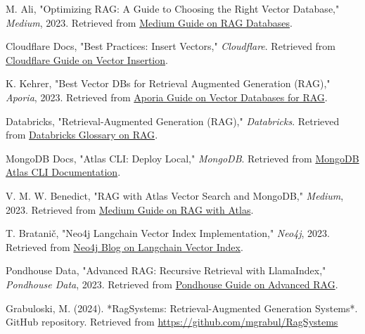 \documentclass{wseas}
\begin{document}
\begin{thebibliography}{9}
   M. Ali, "Optimizing RAG: A Guide to Choosing the Right Vector Database," \textit{Medium}, 2023. Retrieved from \href{https://medium.com/@mutahar789/optimizing-rag-a-guide-to-choosing-the-right-vector-database-480f71a33139}{Medium Guide on RAG Databases}.
  
  Cloudflare Docs, "Best Practices: Insert Vectors," \textit{Cloudflare}. Retrieved from \href{https://developers.cloudflare.com/vectorize/best-practices/insert-vectors/}{Cloudflare Guide on Vector Insertion}.
  
   K. Kehrer, "Best Vector DBs for Retrieval Augmented Generation (RAG)," \textit{Aporia}, 2023. Retrieved from \href{https://www.aporia.com/learn/best-vector-dbs-for-retrieval-augmented-generation-rag/}{Aporia Guide on Vector Databases for RAG}.
  
   Databricks, "Retrieval-Augmented Generation (RAG)," \textit{Databricks}. Retrieved from \href{https://www.databricks.com/glossary/retrieval-augmented-generation-rag}{Databricks Glossary on RAG}.
  
  MongoDB Docs, "Atlas CLI: Deploy Local," \textit{MongoDB}. Retrieved from \href{https://www.mongodb.com/docs/atlas/cli/current/atlas-cli-deploy-local/}{MongoDB Atlas CLI Documentation}.
  
   V. M. W. Benedict, "RAG with Atlas Vector Search and MongoDB," \textit{Medium}, 2023. Retrieved from \href{https://medium.com/@if-21062/rag-with-atlas-vector-search-mongodb-0d2420e00b64}{Medium Guide on RAG with Atlas}.
  
   T. Bratanič, "Neo4j Langchain Vector Index Implementation," \textit{Neo4j}, 2023. Retrieved from \href{https://neo4j.com/developer-blog/neo4j-langchain-vector-index-implementation/}{Neo4j Blog on Langchain Vector Index}.
  
   Pondhouse Data, "Advanced RAG: Recursive Retrieval with LlamaIndex," \textit{Pondhouse Data}, 2023. Retrieved from \href{https://www.pondhouse-data.com/blog/advanced-rag-recursive-retrieval-with-llamaindex}{Pondhouse Guide on Advanced RAG}.
  
   Grabuloski, M. (2024). *RagSystems: Retrieval-Augmented Generation Systems*. GitHub repository. Retrieved from \url{https://github.com/mgrabul/RagSystems}


\end{thebibliography}
\end{document}
